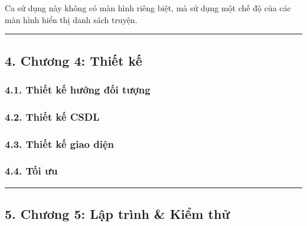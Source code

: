 Ca sử dụng này không có màn hình riêng biệt, mà sử dụng một chế độ của
các màn hình hiển thị danh sách truyện.

\begin{center}\rule{0.5\linewidth}{0.5pt}\end{center}

\hypertarget{chux1b0ux1a1ng-4-thiux1ebft-kux1ebf}{%
  \subsection{\texorpdfstring{4. Chương 4: Thiết kế
    }{4. Chương 4: Thiết kế }}\label{chux1b0ux1a1ng-4-thiux1ebft-kux1ebf}}

\hypertarget{thiux1ebft-kux1ebf-hux1b0ux1edbng-ux111ux1ed1i-tux1b0ux1ee3ng}{%
  \subsubsection{\texorpdfstring{4.1. Thiết kế hướng đối tượng
    }{4.1. Thiết kế hướng đối tượng }}\label{thiux1ebft-kux1ebf-hux1b0ux1edbng-ux111ux1ed1i-tux1b0ux1ee3ng}}

\hypertarget{thiux1ebft-kux1ebf-csdl}{%
  \subsubsection{\texorpdfstring{4.2. Thiết kế CSDL
    }{4.2. Thiết kế CSDL }}\label{thiux1ebft-kux1ebf-csdl}}

\hypertarget{thiux1ebft-kux1ebf-giao-diux1ec7n}{%
  \subsubsection{\texorpdfstring{4.3. Thiết kế giao diện
    }{4.3. Thiết kế giao diện }}\label{thiux1ebft-kux1ebf-giao-diux1ec7n}}

\hypertarget{tux1ed1i-ux1b0u}{%
  \subsubsection{\texorpdfstring{4.4. Tối ưu
    }{4.4. Tối ưu }}\label{tux1ed1i-ux1b0u}}

\begin{center}\rule{0.5\linewidth}{0.5pt}\end{center}

\hypertarget{chux1b0ux1a1ng-5-lux1eadp-truxecnh-kiux1ec3m-thux1eed}{%
  \subsection{\texorpdfstring{5. Chương 5: Lập trình \& Kiểm thử
    }{5. Chương 5: Lập trình \& Kiểm thử }}\label{chux1b0ux1a1ng-5-lux1eadp-truxecnh-kiux1ec3m-thux1eed}}

